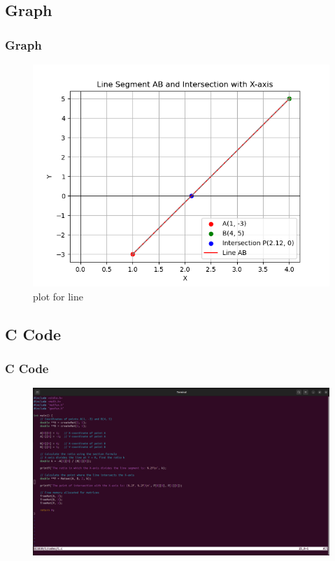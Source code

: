 \documentclass{beamer}
\theoremstyle{remark}
\numberwithin{equation}{section}
\begin{document}
\subsection{Graph}
\begin{frame}
\frametitle{Graph}
\begin{figure}[h]
    \centering
    \includegraphics[width=0.7\columnwidth]{figs/Figure_1.png} 
   \caption{plot for line}
 \end{figure}
\end{frame}

\subsection{C Code}
\begin{frame}
\frametitle{C Code}
\begin{figure}[h]
    \centering
    \includegraphics[width=\columnwidth]{figs/1.png}
 \end{figure}    
 \end{frame}
\end{document}
